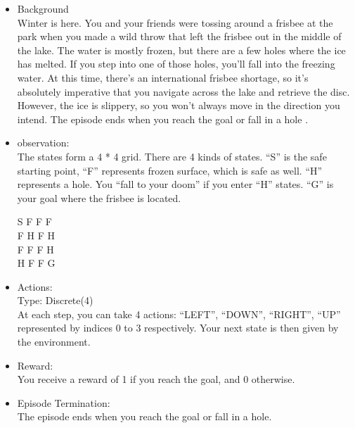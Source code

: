 \documentclass[letterpaper,12pt]{article}
\begin{document}
\begin{itemize}
    \item Background \\
    Winter is here. You and your friends were tossing around a frisbee at the park when you made a wild throw that left the frisbee out in the middle of the lake. The water is mostly frozen, but there are a few holes where the ice has melted. If you step into one of those holes, you’ll fall into the freezing water. At this time, there’s an international frisbee shortage, so it’s absolutely imperative that you navigate across the lake and retrieve the disc. However, the ice is slippery, so you won’t always move in the direction you intend. The episode ends when you reach the goal or fall in a hole \cite{FrozenLake}.


    \item observation: \\
    The states form a 4 * 4 grid. There are 4 kinds of states. “S” is the safe starting point, “F” represents frozen surface, which is safe as well. “H” represents a hole. You “fall to your doom” if you enter “H” states. “G” is your goal where the frisbee is located. \\
    \begin{center}
        S F F F \\
        F H F H \\
        F F F H \\
        H F F G \\
    \end{center}

    \item Actions: \\
    Type: Discrete(4) \\
    At each step, you can take 4 actions: “LEFT”, “DOWN”, “RIGHT”, “UP” represented by indices 0 to 3 respectively. Your next state is then given by the environment.
    
    \item Reward: \\
    You receive a reward of 1 if you reach the goal, and 0 otherwise.
    
    \item Episode Termination: \\
    The episode ends when you reach the goal or fall in a hole. 
\end{itemize}
\end{document}
